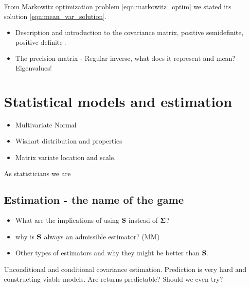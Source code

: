 \documentclass[]{book}
\begin{document}
From Markowitz optimization problem \eqref{eqn:markowitz_optim} we stated its solution \eqref{eqn:mean_var_solution}. 
\begin{itemize}
	\item Description and introduction to the covariance matrix, positive semidefinite, positive definite .
	\item The precision matrix - Regular inverse, what does it represent and mean? Eigenvalues!
\end{itemize}



\chapter{Statistical models and estimation}
\begin{itemize}
	\item Multivariate Normal
	\item Wishart distribution and properties
	\item Matrix variate location and scale. 
\end{itemize}

As statisticians we are 
\section{Estimation - the name of the game}

\begin{itemize}
	\item What are the implications of using $\mathbf{S}$ instead of $\mathbf{\Sigma}$?
	\item why is $\mathbf{S}$  always an admissible estimator? (MM)
	\item Other types of estimators and why they might be better than $\mathbf{S}$.
\end{itemize}

\begin{remark}
	Unconditional and conditional covariance estimation. Prediction is very hard and constructing viable models. Are returns predictable? Should we even try?
\end{remark}
\end{document}
